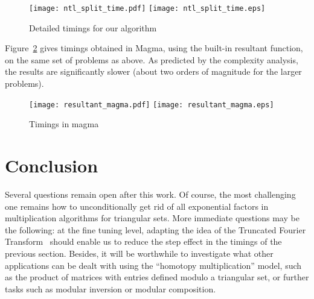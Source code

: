 \documentclass[amsthm]{elsart}
\theoremstyle{plain}
\begin{document}
\begin{figure}[!!!h]
\begin{center}
\ifpdf
\texttt{[image: ntl\_split\_time.pdf]}  
\else
\texttt{[image: ntl\_split\_time.eps]}  
\fi
\end{center}
\caption{Detailed timings for our algorithm}
\label{fig:detailed}
\end{figure}

Figure~\ref{fig:magma} gives timings obtained in Magma, using the
built-in resultant function, on the same set of problems as above. As 
predicted by the complexity analysis, the results are significantly
slower (about two orders of magnitude for the larger problems).

\begin{figure}[!!!h]
\begin{center}
\ifpdf
\texttt{[image: resultant\_magma.pdf]}
\else
\texttt{[image: resultant\_magma.eps]}
\fi
\end{center}
\caption{Timings in magma}
\label{fig:magma}
\end{figure}



\section{Conclusion}

Several questions remain open after this work. Of course, the most
challenging one remains how to unconditionally get rid of all
exponential factors in multiplication algorithms for triangular sets.
More immediate questions may be the following: at the fine tuning
level, adapting the idea of the Truncated Fourier
Transform~\cite{VdH04} should enable us to reduce the step effect in
the timings of the previous section. Besides, it will be worthwhile to
investigate what other applications can be dealt with using the
``homotopy multiplication'' model, such as the product of matrices with 
entries defined modulo a triangular set, or further tasks such as 
modular  inversion or modular composition.



 
\end{document}
